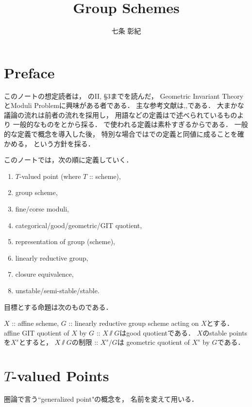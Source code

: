 \documentclass[a4paper]{jsarticle}
\newcommand{\func}[1]{\underline{#1}}
\begin{document}
\title{Group Schemes}
\author{七条 彰紀}
\maketitle

\section{Preface}
    このノートの想定読者は，
    \cite{HarAG}のII, \S 3までを読んだ，
    Geometric Invariant TheoryとModuli Problemに興味がある者である．
    主な参考文献は\cite{Muk1},\cite{AV},\cite{Hos}である．
    大まかな議論の流れは前者の流れを採用し，
    用語などの定義は\cite{Muk1}で述べられているものより
    一般的なものを\cite{AV}と\cite{Hos}から採る．
    \cite{Muk1}で使われる定義は素朴すぎるからである．
    一般的な定義で概念を導入した後，
    特別な場合では\cite{Muk1}での定義と同値に成ることを確かめる，
    という方針を採る．

    このノートでは，次の順に定義していく．
    \begin{enumerate}
        \item $T$-valued point (where $T$ :: scheme),
        \item group scheme,
        \item fine/corse moduli,
        \item categorical/good/geometric/GIT quotient,
        \item representation of group (scheme),
        \item linearly reductive group,
        \item closure equivalence,
        \item unstable/semi-stable/stable.
    \end{enumerate}

    目標とする命題は次のものである．
    \begin{Thm}
        $X$ :: affine scheme,
        $G$ :: linearly reductive group scheme acting on $X$とする．
        affine GIT quotient of $X$ by $G$ :: $X \sslash G$はgood quotientである．
        $X$のstable pointsを$X^s$とすると，
        $X \sslash G$の制限 :: $X^s \slash G$は
        geometric quotient of $X^s$ by $G$である．
    \end{Thm}

\section{$T$-valued Points}
    圏論で言う``generalized point"の概念を，
    名前を変えて用いる．
\end{document}
